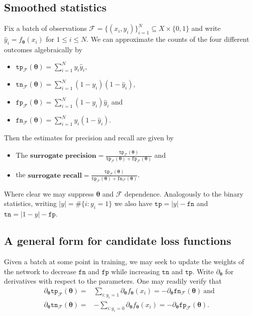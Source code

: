 \documentclass[10pt,a4paper]{article}
\begin{document}
\subsection{Smoothed statistics}

Fix a batch of observations $\mathcal F=\{(x_i,y_i)\}_{i=1}^N\subseteq X\times\{0,1\}$ and write $\hat y_i=f_{\boldsymbol\theta}(x_i)$ for $1\leq i\leq N$.
We can approximate the counts of the four different outcomes algebraically by
\begin{itemize}
  \item $\texttt{tp}_\mathcal F(\boldsymbol\theta)=\sum_{i=1}^N y_i\hat y_i$,
  \item $\texttt{tn}_\mathcal F(\boldsymbol\theta)=\sum_{i=1}^N(1-y_i)(1-\hat y_i)$,
  \item $\texttt{fp}_\mathcal F(\boldsymbol\theta)=\sum_{i=1}^N(1-y_i)\hat y_i$ and
  \item $\texttt{fn}_\mathcal F(\boldsymbol\theta)=\sum_{i=1}^Ny_i(1-\hat y_i)$.
\end{itemize}

Then the estimates for precision and recall are given by
\begin{itemize}
  \item The $\textbf{surrogate precision}=\frac{\texttt{tp}_\mathcal F(\boldsymbol\theta)}{\texttt{tp}_\mathcal F(\boldsymbol\theta)+\texttt{fp}_\mathcal F(\boldsymbol\theta)}$ and
  \item the $\textbf{surrogate recall}=\frac{\texttt{tp}_\mathcal F(\boldsymbol\theta)}{\texttt{tp}_\mathcal F(\boldsymbol\theta)+\texttt{fn}_\mathcal F(\boldsymbol\theta)}$.
\end{itemize}
Where clear we may suppress $\boldsymbol\theta$ and $\mathcal F$ dependence.
Analogously to the binary statistics, writing $|y|=\#\{i:y_i=1\}$ we also have $\texttt{tp}=|y|-\texttt{fn}$ and $\texttt{tn}=|1-y|-\texttt{fp}$.
\subsection{A general form for candidate loss functions}
Given a batch at some point in training, we may seek to update the weights of the network to decrease $\texttt{fn}$ and $\texttt{fp}$ while increasing $\texttt{tn}$ and $\texttt{tp}$.
Write $\partial_{\boldsymbol\theta}$ for derivatives with respect to the parameters.
One may readily verify that
\begin{align*}
  \partial_{\boldsymbol\theta}\texttt{tp}_{\mathcal F}(\boldsymbol\theta)=&\sum_{i:y_i=1}\partial_{\boldsymbol\theta}f_{\boldsymbol\theta}(x_i)=-\partial_{\boldsymbol\theta}\texttt{fn}_{\mathcal F}(\boldsymbol\theta)~\text{and}\\
  \partial_{\boldsymbol\theta}\texttt{tn}_{\mathcal F}(\boldsymbol\theta)=&-\sum_{i:y_i=0}\partial_{\boldsymbol\theta}f_{\boldsymbol\theta}(x_i)=-\partial_{\boldsymbol\theta}\texttt{fp}_{\mathcal F}(\boldsymbol\theta).
\end{align*}
\end{document}
